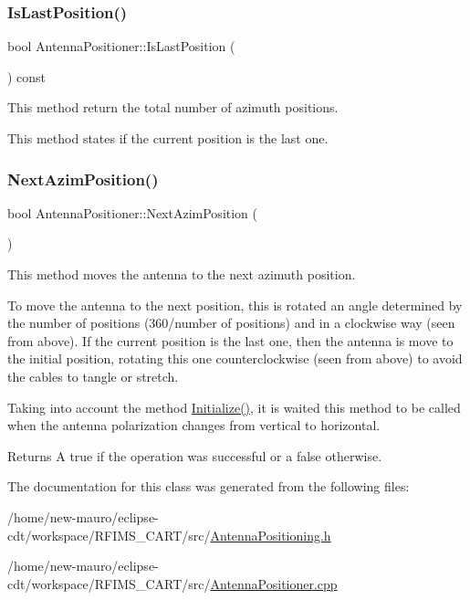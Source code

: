 \subsubsection{\texorpdfstring{Is\+Last\+Position()}{IsLastPosition()}}
{\footnotesize\ttfamily bool Antenna\+Positioner\+::\+Is\+Last\+Position (\begin{DoxyParamCaption}{ }\end{DoxyParamCaption}) const\hspace{0.3cm}{\ttfamily [inline]}}



This method return the total number of azimuth positions. 

This method states if the current position is the last one. \mbox{\label{classAntennaPositioner_a2e05c385b9933d2ee1d4f8f953c99070}} 
\subsubsection{\texorpdfstring{Next\+Azim\+Position()}{NextAzimPosition()}}
{\footnotesize\ttfamily bool Antenna\+Positioner\+::\+Next\+Azim\+Position (\begin{DoxyParamCaption}{ }\end{DoxyParamCaption})}



This method moves the antenna to the next azimuth position. 

To move the antenna to the next position, this is rotated an angle determined by the number of positions (360/number of positions) and in a clockwise way (seen from above). If the current position is the last one, then the antenna is move to the initial position, rotating this one counterclockwise (seen from above) to avoid the cables to tangle or stretch.

Taking into account the method \hyperlink{classAntennaPositioner_a5087caa452709b33082c41b2cef2a23e}{Initialize()}, it is waited this method to be called when the antenna polarization changes from vertical to horizontal. \begin{DoxyReturn}{Returns}
A {\ttfamily true} if the operation was successful or a {\ttfamily false} otherwise. 
\end{DoxyReturn}


The documentation for this class was generated from the following files\+:\begin{DoxyCompactItemize}
\item 
/home/new-\/mauro/eclipse-\/cdt/workspace/\+R\+F\+I\+M\+S\+\_\+\+C\+A\+R\+T/src/\hyperlink{AntennaPositioning_8h}{Antenna\+Positioning.\+h}\item 
/home/new-\/mauro/eclipse-\/cdt/workspace/\+R\+F\+I\+M\+S\+\_\+\+C\+A\+R\+T/src/\hyperlink{AntennaPositioner_8cpp}{Antenna\+Positioner.\+cpp}\end{DoxyCompactItemize}
